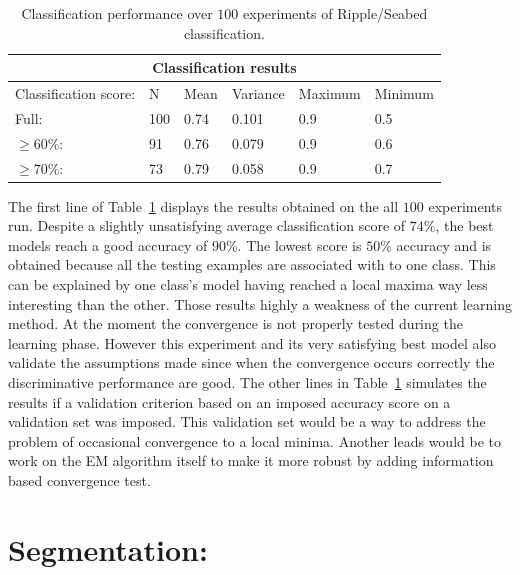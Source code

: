 \documentclass[a4paper,11pt]{report}
\begin{document}
		\begin{center}
			\begin{table}[h]
				\begin{center}				
					\begin{tabular}{ |p{3cm}||p{2cm}|p{2cm}|p{2cm}|p{2cm}|p{2cm}| }
						\hline
						\multicolumn{6}{|c|}{Classification results} \\
						\hline
						Classification score:	&	N			& Mean	& Variance	& Maximum	& Minimum \\
						\hline
						Full:									& 100   & 0.74	& 0.101			& 0.9				&	0.5\\
						$\geq 60\%$: 					& 91    & 0.76	& 0.079			& 0.9				&	0.6\\
						$\geq 70\%$: 					& 73    & 0.79	& 0.058			& 0.9				&	0.7\\
						\hline
					\end{tabular}
				\end{center}
				\caption{Classification performance over $100$ experiments of Ripple/Seabed classification.}
				\label{table:Clf_ripple}
			\end{table}
		\end{center}
		
		The first line of Table~\ref{table:Clf_ripple} displays the results obtained on the all $100$ experiments run. Despite a slightly unsatisfying average  classification score of $74\%$, the best models reach a good accuracy of $90\%$. The lowest score is $50\%$ accuracy and is obtained because all the testing examples are associated with to one class. This can be explained by one class's model having reached a local maxima way less interesting than the other. Those results highly a weakness of the current learning method. At the moment the convergence is not properly tested during the learning phase. However this experiment and its very satisfying best model also validate the assumptions made since when the convergence occurs correctly the discriminative performance are good. The other lines in Table~\ref{table:Clf_ripple} simulates the results if a validation criterion based on an imposed accuracy score on a validation set was imposed. This validation set would be a way to address the problem of occasional convergence to a local minima. Another leads would be to work on the EM algorithm itself to make it more robust by adding information based convergence test.  
		
  \section{Segmentation:}
		\label{sec:Exp/Segmentation:}
		
\end{document}
